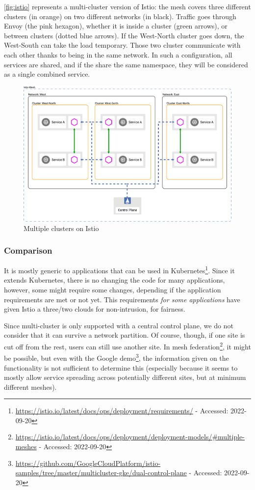 \autoref{fig:istio} represents a multi-cluster version of Istio: the
mesh covers three different clusters (in orange) on two different
networks (in black).
%
Traffic goes through Envoy (the pink hexagon), whether it is inside a
cluster (green arrows), or between clusters (dotted blue arrows).
%
If the West-North cluster goes down, the West-South can take the load
temporary.
%
Those two cluster communicate with each other thanks to being in the
same network.
%
In such a configuration, all services are shared, and if the share the
same namespace, they will be considered as a single combined service.
\begin{figure}[htbp]
  \centering  \includegraphics[width=0.75\linewidth]{figs/pdf/istio-multi-cluster}
  \caption{Multiple clusters on Istio}
  \label{fig:istio}
\end{figure}


\subsubsection*{Comparison}

It is mostly generic to applications that can be used in
Kubernetes\footnote{\url{https://istio.io/latest/docs/ops/deployment/requirements/}
  - Accessed: 2022-09-20}.
%
Since it extends Kubernetes, there is no changing the code for many
applications, however, some might require some changes, depending if
the application requirements are met or not yet.
%
This requirements \emph{for some applications} have given Istio a
three/two clouds for non-intrusion, for fairness.
%

Since multi-cluster is only supported with a central control plane, we
do not consider that it can survive a network partition.
%
Of course, though, if one site is cut off from the rest, users can
still use another site.
%
In mesh
federation\footnote{\url{https://istio.io/latest/docs/ops/deployment/deployment-models/\#multiple-meshes}
  - Accessed: 2022-09-20}, it might be possible, but even with the
Google
demo\footnote{\url{https://github.com/GoogleCloudPlatform/istio-samples/tree/master/multicluster-gke/dual-control-plane}
  - Accessed: 2022-09-20}, the information given on the functionality
is not sufficient to determine this (especially because it seems to
mostly allow service spreading across potentially different sites, but
at minimum different meshes).

